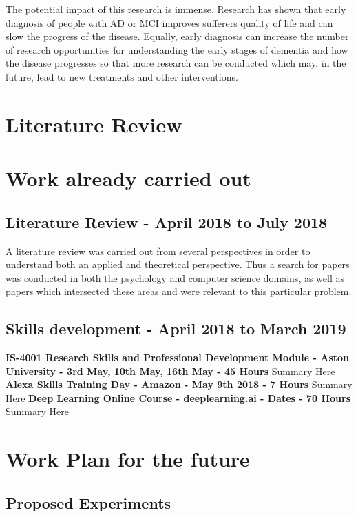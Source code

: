 \documentclass{article}
\begin{document}
	\newline
	\par
	The potential impact of this research is immense. Research has shown that early diagnosis of people with AD or MCI improves sufferers quality of life and can slow the progress of the disease. Equally, early diagnosis can increase the number of research opportunities for understanding the early stages of dementia and how the disease progresses so that more research can be conducted which may, in the future, lead to new treatments and other interventions.
	
	\section{Literature Review}
	
	\section{Work already carried out}
	
	\subsection{Literature Review - April 2018 to July 2018}
	A literature review was carried out from several perspectives in order to understand both an applied and theoretical perspective. Thus a search for papers was conducted in both the psychology and computer science domains, as well as papers which intersected these areas and were relevant to this particular problem.
	
	\subsection{Skills development - April 2018 to March 2019}
	\textbf{IS-4001 Research Skills and Professional Development Module - Aston University - 3rd May, 10th May, 16th May - 45 Hours} 
	Summary Here
	\newline
	\textbf{Alexa Skills Training Day - Amazon - May 9th 2018 - 7 Hours}
	Summary Here
	\newline
	\textbf{Deep Learning Online Course - deeplearning.ai - Dates - 70 Hours}
	Summary Here

	\section{Work Plan for the future}	
	\subsection{Proposed Experiments}
\end{document}
